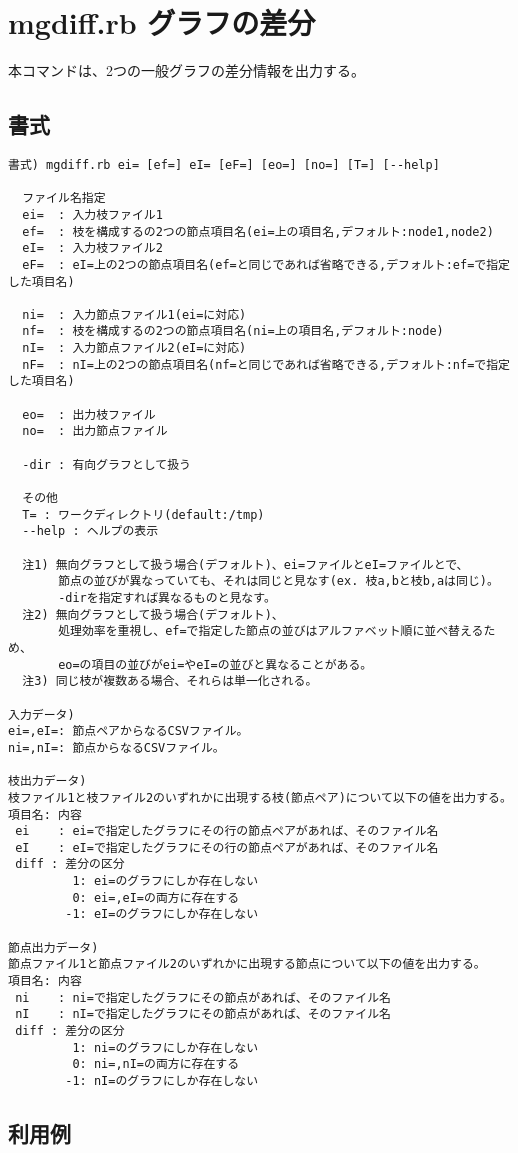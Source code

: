 
\section{mgdiff.rb グラフの差分\label{sect:mgdiff}}

本コマンドは、2つの一般グラフの差分情報を出力する。

\subsection{書式}
\begin{verbatim}
書式) mgdiff.rb ei= [ef=] eI= [eF=] [eo=] [no=] [T=] [--help]

  ファイル名指定
  ei=  : 入力枝ファイル1
  ef=  : 枝を構成するの2つの節点項目名(ei=上の項目名,デフォルト:node1,node2)
  eI=  : 入力枝ファイル2
  eF=  : eI=上の2つの節点項目名(ef=と同じであれば省略できる,デフォルト:ef=で指定した項目名)

  ni=  : 入力節点ファイル1(ei=に対応)
  nf=  : 枝を構成するの2つの節点項目名(ni=上の項目名,デフォルト:node)
  nI=  : 入力節点ファイル2(eI=に対応)
  nF=  : nI=上の2つの節点項目名(nf=と同じであれば省略できる,デフォルト:nf=で指定した項目名)

  eo=  : 出力枝ファイル
  no=  : 出力節点ファイル

  -dir : 有向グラフとして扱う

  その他
  T= : ワークディレクトリ(default:/tmp)
  --help : ヘルプの表示

  注1) 無向グラフとして扱う場合(デフォルト)、ei=ファイルとeI=ファイルとで、
       節点の並びが異なっていても、それは同じと見なす(ex. 枝a,bと枝b,aは同じ)。
       -dirを指定すれば異なるものと見なす。
  注2) 無向グラフとして扱う場合(デフォルト)、
       処理効率を重視し、ef=で指定した節点の並びはアルファベット順に並べ替えるため、
       eo=の項目の並びがei=やeI=の並びと異なることがある。
  注3) 同じ枝が複数ある場合、それらは単一化される。

入力データ)
ei=,eI=: 節点ペアからなるCSVファイル。
ni=,nI=: 節点からなるCSVファイル。

枝出力データ)
枝ファイル1と枝ファイル2のいずれかに出現する枝(節点ペア)について以下の値を出力する。
項目名: 内容
 ei    : ei=で指定したグラフにその行の節点ペアがあれば、そのファイル名
 eI    : eI=で指定したグラフにその行の節点ペアがあれば、そのファイル名
 diff : 差分の区分
         1: ei=のグラフにしか存在しない
         0: ei=,eI=の両方に存在する
        -1: eI=のグラフにしか存在しない

節点出力データ)
節点ファイル1と節点ファイル2のいずれかに出現する節点について以下の値を出力する。
項目名: 内容
 ni    : ni=で指定したグラフにその節点があれば、そのファイル名
 nI    : nI=で指定したグラフにその節点があれば、そのファイル名
 diff : 差分の区分
         1: ni=のグラフにしか存在しない
         0: ni=,nI=の両方に存在する
        -1: nI=のグラフにしか存在しない
\end{verbatim}

\subsection{利用例}



